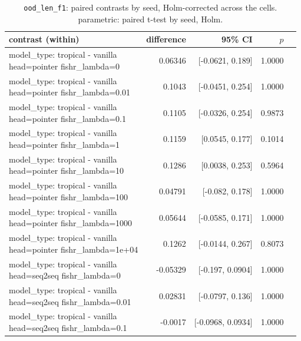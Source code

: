 \documentclass[10pt]{article}
\makeatletter
\newcommand{\stackcell}[1]{\begin{tabular}[t]{@{}l@{}}#1\end{tabular}}
\makeatother
\begin{document}
{\small
\begin{longtable}{lrrrl}
\caption{\texttt{ood\_len\_f1}: paired contrasts by seed, Holm-corrected across the cells. parametric: paired t-test by seed, Holm.}\label{tab:paired-ood_len_f1}\\
\toprule
contrast (within) & difference & 95\% CI & $p$ & \\
\midrule
\endhead
\stackcell{model\_type: tropical - vanilla\\\footnotesize head=pointer fishr\_lambda=0 } & 0.06346 & [-0.0621, 0.189] & 1.0000 & \\
\stackcell{model\_type: tropical - vanilla\\\footnotesize head=pointer fishr\_lambda=0.01 } & 0.1043 & [-0.0451, 0.254] & 1.0000 & \\
\stackcell{model\_type: tropical - vanilla\\\footnotesize head=pointer fishr\_lambda=0.1 } & 0.1105 & [-0.0326, 0.254] & 0.9873 & \\
\stackcell{model\_type: tropical - vanilla\\\footnotesize head=pointer fishr\_lambda=1 } & 0.1159 & [0.0545, 0.177] & 0.1014 & \\
\stackcell{model\_type: tropical - vanilla\\\footnotesize head=pointer fishr\_lambda=10 } & 0.1286 & [0.0038, 0.253] & 0.5964 & \\
\stackcell{model\_type: tropical - vanilla\\\footnotesize head=pointer fishr\_lambda=100 } & 0.04791 & [-0.082, 0.178] & 1.0000 & \\
\stackcell{model\_type: tropical - vanilla\\\footnotesize head=pointer fishr\_lambda=1000 } & 0.05644 & [-0.0585, 0.171] & 1.0000 & \\
\stackcell{model\_type: tropical - vanilla\\\footnotesize head=pointer fishr\_lambda=1e+04 } & 0.1262 & [-0.0144, 0.267] & 0.8073 & \\
\stackcell{model\_type: tropical - vanilla\\\footnotesize head=seq2seq fishr\_lambda=0 } & -0.05329 & [-0.197, 0.0904] & 1.0000 & \\
\stackcell{model\_type: tropical - vanilla\\\footnotesize head=seq2seq fishr\_lambda=0.01 } & 0.02831 & [-0.0797, 0.136] & 1.0000 & \\
\stackcell{model\_type: tropical - vanilla\\\footnotesize head=seq2seq fishr\_lambda=0.1 } & -0.0017 & [-0.0968, 0.0934] & 1.0000 & \\

\end{longtable}}
\end{document}
